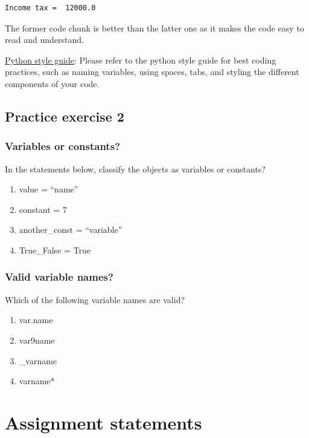 \documentclass[
  letterpaper,
  DIV=11,
  numbers=noendperiod]{scrreprt}
\begin{document}
\begin{verbatim}
Income tax =  12000.0
\end{verbatim}

The former code chunk is better than the latter one as it makes the code
easy to read and understand.

\href{https://peps.python.org/pep-0008/}{Python style guide}: Please
refer to the python style guide for best coding practices, such as
naming variables, using spaces, tabs, and styling the different
components of your code.

\hypertarget{practice-exercise-2}{%
\subsection{Practice exercise 2}\label{practice-exercise-2}}

\hypertarget{variables-or-constants}{%
\subsubsection{Variables or constants?}\label{variables-or-constants}}

In the statements below, classify the objects as variables or constants?

\begin{enumerate}
\def\labelenumi{\arabic{enumi}.}
\item
  value = ``name''
\item
  constant = 7
\item
  another\_const = ``variable''
\item
  True\_False = True
\end{enumerate}

\hypertarget{valid-variable-names}{%
\subsubsection{Valid variable names?}\label{valid-variable-names}}

Which of the following variable names are valid?

\begin{enumerate}
\def\labelenumi{\arabic{enumi}.}
\item
  var.name
\item
  var9name
\item
  \_varname
\item
  varname*
\end{enumerate}

\hypertarget{assignment-statements}{%
\section{Assignment statements}\label{assignment-statements}}
\end{document}
